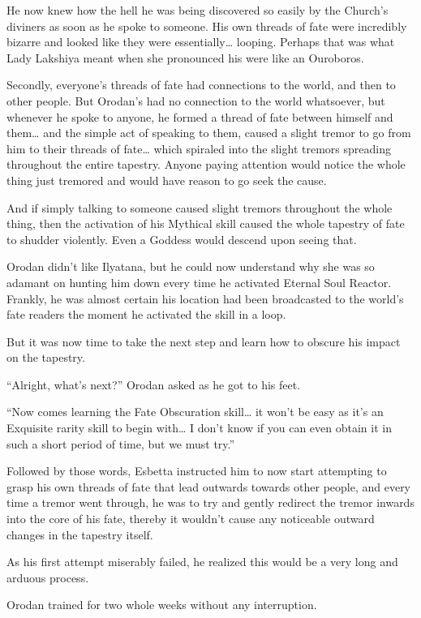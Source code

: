 \documentclass[a4paper,10pt]{book}
\begin{document}
He now knew how the hell he was being discovered so easily by the Church’s diviners as soon as he spoke to someone. His own threads of fate were incredibly bizarre and looked like they were essentially… looping. Perhaps that was what Lady Lakshiya meant when she pronounced his were like an Ouroboros.\par
Secondly, everyone’s threads of fate had connections to the world, and then to other people. But Orodan’s had no connection to the world whatsoever, but whenever he spoke to anyone, he formed a thread of fate between himself and them… and the simple act of speaking to them, caused a slight tremor to go from him to their threads of fate… which spiraled into the slight tremors spreading throughout the entire tapestry. Anyone paying attention would notice the whole thing just tremored and would have reason to go seek the cause.\par
And if simply talking to someone caused slight tremors throughout the whole thing, then the activation of his Mythical skill caused the whole tapestry of fate to shudder violently. Even a Goddess would descend upon seeing that.\par
Orodan didn’t like Ilyatana, but he could now understand why she was so adamant on hunting him down every time he activated Eternal Soul Reactor. Frankly, he was almost certain his location had been broadcasted to the world’s fate readers the moment he activated the skill in a loop.\par
But it was now time to take the next step and learn how to obscure his impact on the tapestry.\par
“Alright, what’s next?” Orodan asked as he got to his feet.\par
“Now comes learning the Fate Obscuration skill… it won’t be easy as it’s an Exquisite rarity skill to begin with… I don’t know if you can even obtain it in such a short period of time, but we must try.”\par
Followed by those words, Esbetta instructed him to now start attempting to grasp his own threads of fate that lead outwards towards other people, and every time a tremor went through, he was to try and gently redirect the tremor inwards into the core of his fate, thereby it wouldn’t cause any noticeable outward changes in the tapestry itself.\par
As his first attempt miserably failed, he realized this would be a very long and arduous process.\par
\par
Orodan trained for two whole weeks without any interruption.\par
\end{document}
